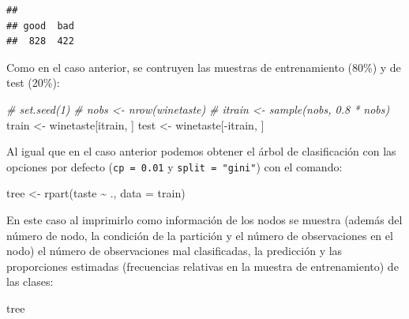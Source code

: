 \documentclass[
]{book}
\newenvironment{Shaded}{\begin{snugshade}}{\end{snugshade}}
\newcommand{\AttributeTok}[1]{\textcolor[rgb]{0.77,0.63,0.00}{#1}}
\newcommand{\CommentTok}[1]{\textcolor[rgb]{0.56,0.35,0.01}{\textit{#1}}}
\newcommand{\FunctionTok}[1]{\textcolor[rgb]{0.00,0.00,0.00}{#1}}
\newcommand{\NormalTok}[1]{#1}
\newcommand{\OtherTok}[1]{\textcolor[rgb]{0.56,0.35,0.01}{#1}}
\newcommand{\SpecialCharTok}[1]{\textcolor[rgb]{0.00,0.00,0.00}{#1}}
\theoremstyle{break}
\theoremstyle{definition}
\theoremstyle{definition}
\theoremstyle{definition}
\theoremstyle{definition}
\theoremstyle{remark}
\begin{document}
\begin{Shaded}
\end{Shaded}

\begin{verbatim}
## 
## good  bad 
##  828  422
\end{verbatim}

Como en el caso anterior, se contruyen las muestras de entrenamiento (80\%) y de test (20\%):

\begin{Shaded}
\begin{Highlighting}[]
\CommentTok{\# set.seed(1)}
\CommentTok{\# nobs \textless{}{-} nrow(winetaste)}
\CommentTok{\# itrain \textless{}{-} sample(nobs, 0.8 * nobs)}
\NormalTok{train }\OtherTok{\textless{}{-}}\NormalTok{ winetaste[itrain, ]}
\NormalTok{test }\OtherTok{\textless{}{-}}\NormalTok{ winetaste[}\SpecialCharTok{{-}}\NormalTok{itrain, ]}
\end{Highlighting}
\end{Shaded}

Al igual que en el caso anterior podemos obtener el árbol de clasificación con las opciones por defecto (\texttt{cp\ =\ 0.01} y \texttt{split\ =\ "gini"}) con el comando:

\begin{Shaded}
\begin{Highlighting}[]
\NormalTok{tree }\OtherTok{\textless{}{-}} \FunctionTok{rpart}\NormalTok{(taste }\SpecialCharTok{\textasciitilde{}}\NormalTok{ ., }\AttributeTok{data =}\NormalTok{ train)}
\end{Highlighting}
\end{Shaded}

En este caso al imprimirlo como información de los nodos se muestra (además del número de nodo, la condición de la partición y el número de observaciones en el nodo) el número de observaciones mal clasificadas, la predicción y las proporciones estimadas (frecuencias relativas en la muestra de entrenamiento) de las clases:

\begin{Shaded}
\begin{Highlighting}[]
\NormalTok{tree}
\end{Highlighting}
\end{Shaded}
\end{document}
